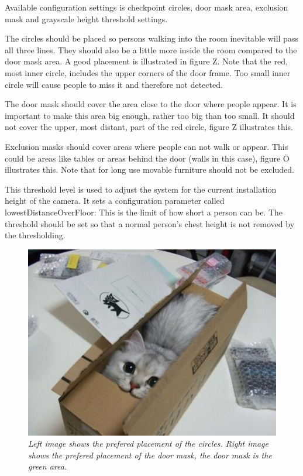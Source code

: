 Available configuration settings is checkpoint circles, door mask area, exclusion mask and grayscale height threshold settings. 

The circles should be placed so persons walking into the room inevitable will pass all three lines. They should also be a little more inside the room compared to the door mask area. A good placement is illustrated in figure Z. Note that the red, most inner circle, includes the upper corners of the door frame. Too small inner circle will cause people to miss it and therefore not detected. 

The door mask should cover the area close to the door where people appear. It is important to make this area big enough, rather too big than too small. It should not cover the upper, most distant, part of the red circle, figure Z illustrates this. 

Exclusion masks should cover areas where people can not walk or appear. This could be areas like tables or areas behind the door (walls in this case), figure Ö illustrates this. Note that for long use movable furniture should not be excluded. 

This threshold level is used to adjust the system for the current installation height of the camera. It sets a configuration parameter called lowestDistanceOverFloor: This is the limit of how short a person can be. The threshold should be set so that a normal person’s chest height is not removed by the thresholding. 


\begin{figure}[htb]
	\centering
	\includegraphics[width=\linewidth]{images/boxcat.jpg}
	\caption[Circle placment]{\textit{Left image shows the prefered placement of the circles. Right image shows the prefered placement of the door mask, the door mask is the green area. }}
	\label{fig:circlePlacement}  %
\end{figure}


